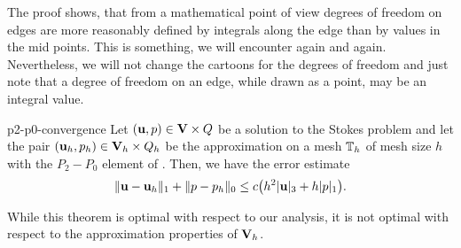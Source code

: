 \begin{remark}
  The proof shows, that from a mathematical point of view degrees of
  freedom on edges are more reasonably defined by integrals along the
  edge than by values in the mid points. This is something, we will
  encounter again and again. Nevertheless, we will not change the
  cartoons for the degrees of freedom and just note that a degree of
  freedom on an edge, while drawn as a point, may be an integral value.
\end{remark}

\begin{Theorem}{p2-p0-convergence}
  Let $(\mathbf u,p)\in \mathbf V\times Q$ be a solution to the Stokes problem and let
  the pair $(\mathbf u_h,p_h) \in \mathbf V_h\times Q_h$ be the approximation on a
  mesh $\mathbb T_h$ of mesh size $h$ with the $P_2-P_0$ element of
  . Then, we have the error
  estimate
  \begin{gather}
    \lVert\mathbf u-\mathbf u_h\rVert_1 + \lVert p-p_h\rVert_0
    \le c \bigl(h^2\lvert\mathbf u\rvert_3 + h \lvert p\rvert_1\bigr).
  \end{gather}
\end{Theorem}

\begin{remark}
  While this theorem is optimal with respect to our analysis, it is
  not optimal with respect to the approximation properties of $\mathbf V_h$.
\end{remark}

